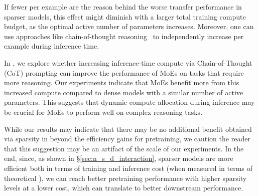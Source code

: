 If fewer \flops per example are the reason behind the worse transfer performance in sparser models, this effect might diminish with a larger total training compute budget, as the optimal active number of parameters increases. Moreover, one can use approaches like chain-of-thought reasoning~\citep{wei2022chain_cot} to independently increase \flops per example during inference time. 

In , we explore whether increasing inference-time compute via Chain-of-Thought (CoT) prompting can improve the performance of MoEs on tasks that require more reasoning. Our experiments indicate that MoEs benefit more from this increased compute compared to dense models with a similar number of active parameters. This suggests that dynamic compute allocation during inference may be crucial for MoEs to perform well on complex reasoning tasks.

While our results may indicate that there may be no additional benefit obtained via sparsity in \moes beyond the efficiency gains for pretraining, we caution the reader that this suggestion may be an artifact of the scale of our experiments. In the end, since, as shown in \S\ref{sec:n_s_d_interaction}, sparser models are more efficient both in terms of training and inference cost (when measured in terms of theoretical \flops), we can reach better pretraining performance with higher sparsity levels at a lower cost, which can translate to better downstream performance.




